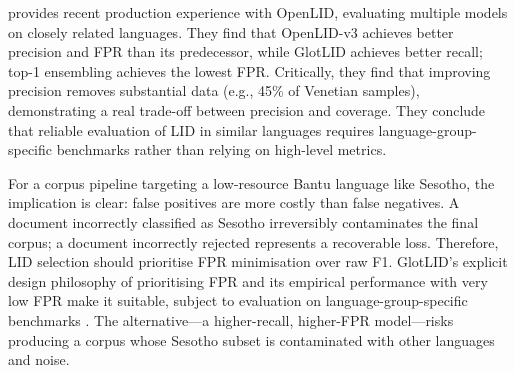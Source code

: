 \documentclass[12pt]{ThesisRU}
\begin{document}
\citet{fedorova2026openlid} provides recent production experience with OpenLID, evaluating multiple models on closely related languages. They find that OpenLID-v3 achieves better precision and FPR than its predecessor, while GlotLID achieves better recall; top-1 ensembling achieves the lowest FPR. Critically, they find that improving precision removes substantial data (e.g., 45\% of Venetian samples), demonstrating a real trade-off between precision and coverage. They conclude that reliable evaluation of LID in similar languages requires language-group-specific benchmarks rather than relying on high-level metrics.

For a corpus pipeline targeting a low-resource Bantu language like Sesotho, the implication is clear: false positives are more costly than false negatives. A document incorrectly classified as Sesotho irreversibly contaminates the final corpus; a document incorrectly rejected represents a recoverable loss. Therefore, LID selection should prioritise FPR minimisation over raw F1. GlotLID's explicit design philosophy of prioritising FPR \citet{kargaran2024glotcc} and its empirical performance with very low FPR make it suitable, subject to evaluation on language-group-specific benchmarks \citep{fedorova2026openlid}. The alternative—a higher-recall, higher-FPR model—risks producing a corpus whose Sesotho subset is contaminated with other languages and noise.
\clearpage
\end{document}
